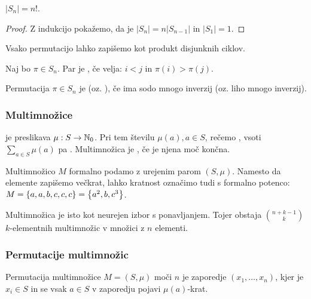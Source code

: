 \begin{trditev}
    $|S_n| = n!$.
\end{trditev}

\begin{proof}
    Z indukcijo pokažemo, da je $|S_n| = n|S_{n-1}|$ in $|S_1| = 1$.
\end{proof}

\begin{trditev}
    Vsako permutacijo lahko zapišemo kot produkt disjunknih ciklov.
\end{trditev}

\begin{definicija}
    Naj bo $\pi \in S_n$. Par je , če velja: $i < j$ in $\pi(i) > \pi(j)$.
\end{definicija}

\begin{definicija}
    Permutacija $\pi \in S_n$ je  (oz. ), če ima sodo mnogo inverzij (oz. liho mnogo inverzij).
\end{definicija}

\subsubsection{Multimnožice}
\begin{definicija}
     je preslikava $\mu: S \to \mathbb{N}_0$. Pri tem številu $\mu(a), a \in S$, rečemo , vsoti $\sum_{a \in S} \mu(a)$ pa . Multimnožica je , če je njena moč končna.
\end{definicija}

\begin{opomba}
    Multimnožico $M$ formalno podamo z urejenim parom $(S, \mu)$. Namesto da elemente zapišemo večkrat, lahko kratnost označimo tudi s formalno potenco: $M = \left\{a, a, b, c, c, c\right\} = \left\{a^2, b, c^3\right\}$.

    Multimnožica je isto kot neurejen izbor s ponavljanjem. Tojer obstaja $\binom{n+k-1}{k}$ $k$-elementnih multimnožic v množici z $n$ elementi.
\end{opomba}

\subsubsection{Permutacije multimnožic}
Permutacija multimnožice $M = (S, \mu)$ moči $n$ je zaporedje $(x_1, \ldots, x_n)$, kjer je $x_i \in S$ in se vsak $a \in S$ v zaporedju pojavi $\mu(a)$-krat.

